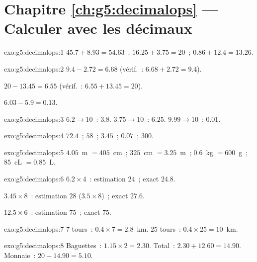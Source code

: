 \section*{Chapitre \ref{ch:g5:decimalops} --- Calculer avec les décimaux}

\begin{solution}{exo:g5:decimalops:1}
$45.7 + 8.93 = 54.63$~; \quad
$16.25 + 3.75 = 20$~; \quad
$0.86 + 12.4 = 13.26$.
\end{solution}

\begin{solution}{exo:g5:decimalops:2}
$9.4 - 2.72 = 6.68$ (vérif.~: $6.68 + 2.72 = 9.4$).

$20 - 13.45 = 6.55$ (vérif.~: $6.55 + 13.45 = 20$).

$6.03 - 5.9 = 0.13$.
\end{solution}

\begin{solution}{exo:g5:decimalops:3}
$6.2 \to 10$~: $3.8$. \quad $3.75 \to 10$~: $6.25$. \quad
$9.99 \to 10$~: $0.01$.
\end{solution}

\begin{solution}{exo:g5:decimalops:4}
$72.4$~; \quad $58$~; \quad $3.45$~; \quad $0.07$~; \quad $300$.
\end{solution}

\begin{solution}{exo:g5:decimalops:5}
$4.05$~m $= 405$~cm~; \quad $325$~cm $= 3.25$~m~; \quad
$0.6$~kg $= 600$~g~; \quad $85$~cL $= 0.85$~L.
\end{solution}

\begin{solution}{exo:g5:decimalops:6}
$6.2 \times 4$~: estimation $24$~; exact $24.8$.

$3.45 \times 8$~: estimation $28$ ($3.5 \times 8$)~; exact $27.6$.

$12.5 \times 6$~: estimation $75$~; exact $75$.
\end{solution}

\begin{solution}{exo:g5:decimalops:7}
$7$ tours~: $0.4 \times 7 = 2.8$~km. $25$ tours~:
$0.4 \times 25 = 10$~km.
\end{solution}

\begin{solution}{exo:g5:decimalops:8}
Baguettes~: $1.15 \times 2 = 2.30$. Total~: $2.30 + 12.60 = 14.90$.
Monnaie~: $20 - 14.90 = 5.10$.
\end{solution}

